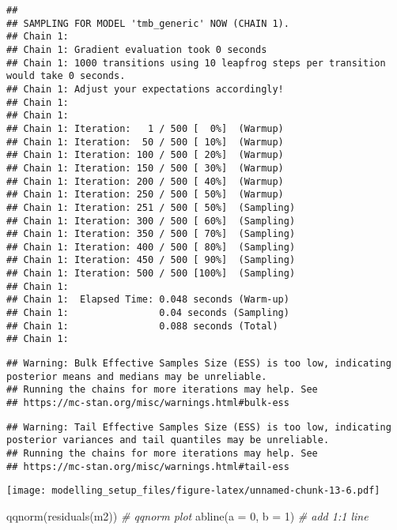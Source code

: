 \documentclass[
]{article}
\newenvironment{Shaded}{\begin{snugshade}}{\end{snugshade}}
\newcommand{\AttributeTok}[1]{\textcolor[rgb]{0.77,0.63,0.00}{#1}}
\newcommand{\CommentTok}[1]{\textcolor[rgb]{0.56,0.35,0.01}{\textit{#1}}}
\newcommand{\DecValTok}[1]{\textcolor[rgb]{0.00,0.00,0.81}{#1}}
\newcommand{\FunctionTok}[1]{\textcolor[rgb]{0.00,0.00,0.00}{#1}}
\newcommand{\NormalTok}[1]{#1}
\begin{document}
\begin{verbatim}
## 
## SAMPLING FOR MODEL 'tmb_generic' NOW (CHAIN 1).
## Chain 1: 
## Chain 1: Gradient evaluation took 0 seconds
## Chain 1: 1000 transitions using 10 leapfrog steps per transition would take 0 seconds.
## Chain 1: Adjust your expectations accordingly!
## Chain 1: 
## Chain 1: 
## Chain 1: Iteration:   1 / 500 [  0%]  (Warmup)
## Chain 1: Iteration:  50 / 500 [ 10%]  (Warmup)
## Chain 1: Iteration: 100 / 500 [ 20%]  (Warmup)
## Chain 1: Iteration: 150 / 500 [ 30%]  (Warmup)
## Chain 1: Iteration: 200 / 500 [ 40%]  (Warmup)
## Chain 1: Iteration: 250 / 500 [ 50%]  (Warmup)
## Chain 1: Iteration: 251 / 500 [ 50%]  (Sampling)
## Chain 1: Iteration: 300 / 500 [ 60%]  (Sampling)
## Chain 1: Iteration: 350 / 500 [ 70%]  (Sampling)
## Chain 1: Iteration: 400 / 500 [ 80%]  (Sampling)
## Chain 1: Iteration: 450 / 500 [ 90%]  (Sampling)
## Chain 1: Iteration: 500 / 500 [100%]  (Sampling)
## Chain 1: 
## Chain 1:  Elapsed Time: 0.048 seconds (Warm-up)
## Chain 1:                0.04 seconds (Sampling)
## Chain 1:                0.088 seconds (Total)
## Chain 1:
\end{verbatim}

\begin{verbatim}
## Warning: Bulk Effective Samples Size (ESS) is too low, indicating posterior means and medians may be unreliable.
## Running the chains for more iterations may help. See
## https://mc-stan.org/misc/warnings.html#bulk-ess
\end{verbatim}

\begin{verbatim}
## Warning: Tail Effective Samples Size (ESS) is too low, indicating posterior variances and tail quantiles may be unreliable.
## Running the chains for more iterations may help. See
## https://mc-stan.org/misc/warnings.html#tail-ess
\end{verbatim}

\texttt{[image: modelling\_setup\_files/figure-latex/unnamed-chunk-13-6.pdf]}

\begin{Shaded}
\begin{Highlighting}[]
\FunctionTok{qqnorm}\NormalTok{(}\FunctionTok{residuals}\NormalTok{(m2)) }\CommentTok{\# qqnorm plot}
\FunctionTok{abline}\NormalTok{(}\AttributeTok{a =} \DecValTok{0}\NormalTok{, }\AttributeTok{b =} \DecValTok{1}\NormalTok{) }\CommentTok{\# add 1:1 line}
\end{Highlighting}
\end{Shaded}
\end{document}
